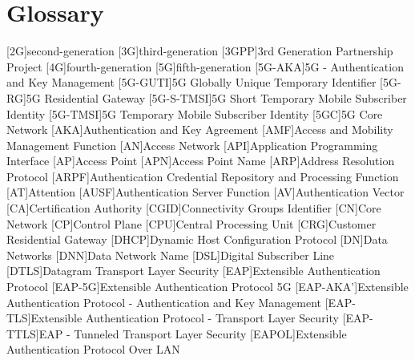 \chapter{Glossary}

\footnotesize
\SingleSpacing

\begin{multicols}{2}
    \begin{acronym}[WPA]

        [2G]{second-generation}
        [3G]{third-generation}
        [3GPP]{3rd Generation Partnership Project}
        [4G]{fourth-generation}
        [5G]{fifth-generation}
        [5G-AKA]{5G - Authentication and Key Management}
        [5G-GUTI]{5G Globally Unique Temporary Identifier}
        [5G-RG]{5G Residential Gateway}
        [5G-S-TMSI]{5G Short Temporary Mobile Subscriber Identity}
        [5G-TMSI]{5G Temporary Mobile Subscriber Identity}
        [5GC]{5G Core Network}
        [AKA]{Authentication and Key Agreement}
        [AMF]{Access and Mobility Management Function}
        [AN]{Access Network}
        [API]{Application Programming Interface}
        [AP]{Access Point}
        [APN]{Access Point Name}
        [ARP]{Address Resolution Protocol}
        [ARPF]{Authentication Credential Repository and Processing Function}
        [AT]{Attention}
        [AUSF]{Authentication Server Function}
        [AV]{Authentication Vector}
        [CA]{Certification Authority}
        [CGID]{Connectivity Groups Identifier}
        [CN]{Core Network}
        [CP]{Control Plane}
        [CPU]{Central Processing Unit}
        [CRG]{Customer Residential Gateway}
        [DHCP]{Dynamic Host Configuration Protocol}
        [DN]{Data Networks}
        [DNN]{Data Network Name}
        [DSL]{Digital Subscriber Line}
        [DTLS]{Datagram Transport Layer Security}
        [EAP]{Extensible Authentication Protocol}
        [EAP-5G]{Extensible Authentication Protocol 5G}
        [EAP-AKA']{Extensible Authentication Protocol - Authentication and Key Management}
        [EAP-TLS]{Extensible Authentication Protocol - Transport Layer Security}
        [EAP-TTLS]{EAP - Tunneled Transport Layer Security}
        [EAPOL]{Extensible Authentication Protocol Over LAN}

\end{acronym}
\end{multicols}
